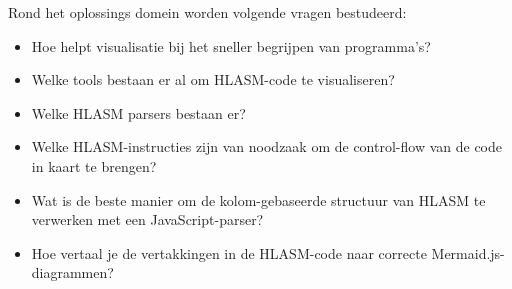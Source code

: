 Rond het oplossings domein worden volgende vragen bestudeerd:

\begin{itemize}
    \item Hoe helpt visualisatie bij het sneller begrijpen van programma's?
    \item Welke tools bestaan er al om HLASM-code te visualiseren?
    \item Welke HLASM parsers bestaan er?
    \item Welke HLASM-instructies zijn van noodzaak om de control-flow van de code in kaart te brengen?
    \item Wat is de beste manier om de kolom-gebaseerde structuur van HLASM te verwerken met een JavaScript-parser?
    \item Hoe vertaal je de vertakkingen in de HLASM-code naar correcte Mermaid.js-diagrammen?
\end{itemize}




